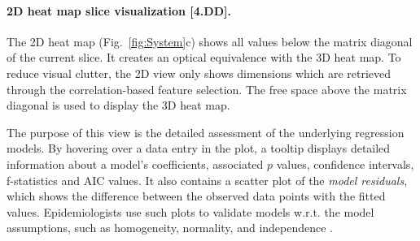 \documentclass[journal]{style/vgtc} 			          %
\begin{document}
\paragraph{2D heat map slice visualization [\textbf{4.DD}].}
The 2D heat map (Fig.~\ref{fig:System}c) shows all values below the matrix diagonal of the current slice.
It creates an optical equivalence with the 3D heat map.
To reduce visual clutter, the 2D view only shows dimensions which are retrieved through the correlation-based feature selection.
The free space above the matrix diagonal is used to display the 3D heat map.

The purpose of this view is the detailed assessment of the underlying regression models.
By hovering over a data entry in the plot, a tooltip displays detailed information about a model's coefficients, associated $p$ values, confidence intervals, f-statistics and AIC values.
It also contains a scatter plot of the \emph{model residuals}, which shows the difference between the observed data points with the fitted values.
Epidemiologists use such plots to validate models w.r.t. the model assumptions, such as homogeneity, normality, and independence \cite{GraphicModelAssessment}.
\end{document}
